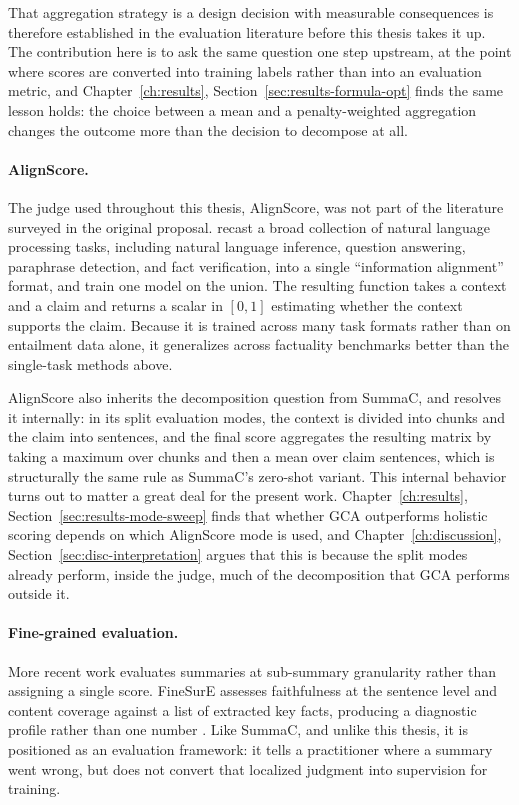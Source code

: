 That aggregation strategy is a design decision with measurable consequences is
therefore established in the evaluation literature before this thesis takes it up.
The contribution here is to ask the same question one step upstream, at the point
where scores are converted into training labels rather than into an evaluation
metric, and Chapter~\ref{ch:results}, Section~\ref{sec:results-formula-opt} finds
the same lesson holds: the choice between a mean and a penalty-weighted
aggregation changes the outcome more than the decision to decompose at all.

\paragraph{AlignScore.} The judge used throughout this thesis, AlignScore, was not
part of the literature surveyed in the original proposal. \citet{zha2023alignscore}
recast a broad collection of natural language processing tasks, including natural
language inference, question answering, paraphrase detection, and fact
verification, into a single ``information alignment'' format, and train one model
on the union. The resulting function takes a context and a claim and returns a
scalar in $[0,1]$ estimating whether the context supports the claim. Because it is
trained across many task formats rather than on entailment data alone, it
generalizes across factuality benchmarks better than the single-task methods above.

AlignScore also inherits the decomposition question from SummaC, and resolves it
internally: in its split evaluation modes, the context is divided into chunks and
the claim into sentences, and the final score aggregates the resulting matrix by
taking a maximum over chunks and then a mean over claim sentences, which is
structurally the same rule as SummaC's zero-shot variant. This internal behavior
turns out to matter a great deal for the present work.
Chapter~\ref{ch:results}, Section~\ref{sec:results-mode-sweep} finds that whether
GCA outperforms holistic scoring depends on which AlignScore mode is used, and
Chapter~\ref{ch:discussion}, Section~\ref{sec:disc-interpretation} argues that this
is because the split modes already perform, inside the judge, much of the
decomposition that GCA performs outside it.

\paragraph{Fine-grained evaluation.} More recent work evaluates summaries at
sub-summary granularity rather than assigning a single score. FineSurE assesses
faithfulness at the sentence level and content coverage against a list of extracted
key facts, producing a diagnostic profile rather than one number
\citep{song2024finesure}. Like SummaC, and unlike this thesis, it is positioned as
an evaluation framework: it tells a practitioner where a summary went wrong, but
does not convert that localized judgment into supervision for training.

